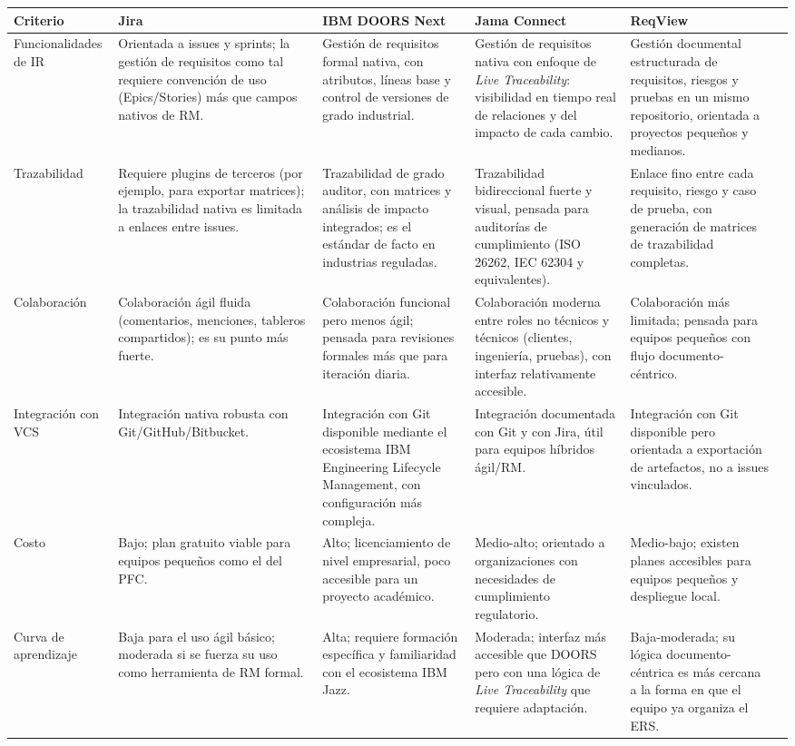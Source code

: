 \documentclass[11pt,a4paper]{article}
\begin{document}
\begin{longtable}{|p{2.6cm}|p{2.6cm}|p{2.6cm}|p{2.6cm}|p{2.6cm}|p{2.6cm}|}
\hline
\textbf{Criterio} & \textbf{Jira} & \textbf{IBM DOORS Next} & \textbf{Jama Connect} & \textbf{ReqView} \\
\hline
Funcionalidades de IR & Orientada a issues y sprints; la gestión de requisitos como tal requiere convención de uso (Epics/Stories) más que campos nativos de RM. & Gestión de requisitos formal nativa, con atributos, líneas base y control de versiones de grado industrial. & Gestión de requisitos nativa con enfoque de \textit{Live Traceability}: visibilidad en tiempo real de relaciones y del impacto de cada cambio. & Gestión documental estructurada de requisitos, riesgos y pruebas en un mismo repositorio, orientada a proyectos pequeños y medianos. \\
\hline
Trazabilidad & Requiere plugins de terceros (por ejemplo, para exportar matrices); la trazabilidad nativa es limitada a enlaces entre issues. & Trazabilidad de grado auditor, con matrices y análisis de impacto integrados; es el estándar de facto en industrias reguladas. & Trazabilidad bidireccional fuerte y visual, pensada para auditorías de cumplimiento (ISO 26262, IEC 62304 y equivalentes). & Enlace fino entre cada requisito, riesgo y caso de prueba, con generación de matrices de trazabilidad completas. \\
\hline
Colaboración & Colaboración ágil fluida (comentarios, menciones, tableros compartidos); es su punto más fuerte. & Colaboración funcional pero menos ágil; pensada para revisiones formales más que para iteración diaria. & Colaboración moderna entre roles no técnicos y técnicos (clientes, ingeniería, pruebas), con interfaz relativamente accesible. & Colaboración más limitada; pensada para equipos pequeños con flujo documento-céntrico. \\
\hline
Integración con VCS & Integración nativa robusta con Git/GitHub/Bitbucket. & Integración con Git disponible mediante el ecosistema IBM Engineering Lifecycle Management, con configuración más compleja. & Integración documentada con Git y con Jira, útil para equipos híbridos ágil/RM. & Integración con Git disponible pero orientada a exportación de artefactos, no a issues vinculados. \\
\hline
Costo & Bajo; plan gratuito viable para equipos pequeños como el del PFC. & Alto; licenciamiento de nivel empresarial, poco accesible para un proyecto académico. & Medio-alto; orientado a organizaciones con necesidades de cumplimiento regulatorio. & Medio-bajo; existen planes accesibles para equipos pequeños y despliegue local. \\
\hline
Curva de aprendizaje & Baja para el uso ágil básico; moderada si se fuerza su uso como herramienta de RM formal. & Alta; requiere formación específica y familiaridad con el ecosistema IBM Jazz. & Moderada; interfaz más accesible que DOORS pero con una lógica de \textit{Live Traceability} que requiere adaptación. & Baja-moderada; su lógica documento-céntrica es más cercana a la forma en que el equipo ya organiza el ERS. \\
\hline
\end{longtable}
\end{document}
